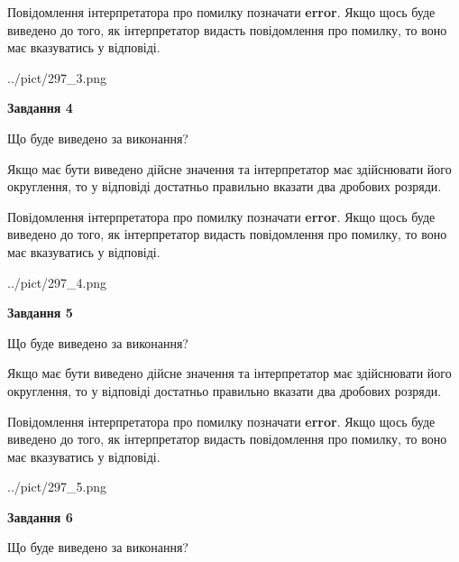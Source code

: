 \documentclass[12pt, ukrainian]{article}
\begin{document}
{\begin {Large}
Повідомлення інтерпретатора про помилку позначати \textbf{error}.
Якщо щось буде виведено до того, як інтерпретатор видасть повідомлення про помилку, 
то воно має вказуватись у відповіді. \par

\begin{center}
	{../pict/297_3.png}
\end{center}
\newpage

{\begin {center}\textbf{Завдання 4}\end {center}}\par
Що буде виведено за виконання? \par

Якщо має бути виведено дійсне значення та інтерпретатор має здійснювати його округлення, 
то у відповіді достатньо правильно вказати два дробових розряди.

Повідомлення інтерпретатора про помилку позначати \textbf{error}.
Якщо щось буде виведено до того, як інтерпретатор видасть повідомлення про помилку, 
то воно має вказуватись у відповіді. \par

\begin{center}
	{../pict/297_4.png}
\end{center}
\newpage

{\begin {center}\textbf{Завдання 5}\end {center}}\par
Що буде виведено за виконання? \par

Якщо має бути виведено дійсне значення та інтерпретатор має здійснювати його округлення, 
то у відповіді достатньо правильно вказати два дробових розряди.

Повідомлення інтерпретатора про помилку позначати \textbf{error}.
Якщо щось буде виведено до того, як інтерпретатор видасть повідомлення про помилку, 
то воно має вказуватись у відповіді. \par

\begin{center}
	{../pict/297_5.png}
\end{center}
\newpage

{\begin {center}\textbf{Завдання 6}\end {center}}\par
Що буде виведено за виконання? \par


\end{Large}}
\end{document}
